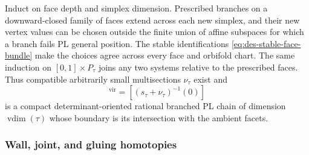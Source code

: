 Induct on face depth and simplex dimension.  Prescribed branches on a
downward-closed family of faces extend across each new simplex, and their
new vertex values can be chosen outside the finite union of affine
subspaces for which a branch fails PL general position.  The stable
identifications \eqref{eq:des-stable-face-bundle} make the choices agree
across every face and orbifold chart.  The same induction on
$[0,1]\times P_\tau$ joins any two systems relative to the prescribed faces.
Thus compatible arbitrarily small multisections $\nu_\tau$ exist and
\begin{equation}
 [Z_\tau]^{\mathrm{vir}}=[(s_\tau+\nu_\tau)^{-1}(0)]
 \label{eq:des-virtual-zero}
\end{equation}
is a compact determinant-oriented rational branched PL chain of dimension
$\operatorname{vdim}(\tau)$ whose boundary is its intersection with the
ambient facets.

\subsubsection{Wall, joint, and gluing homotopies}


